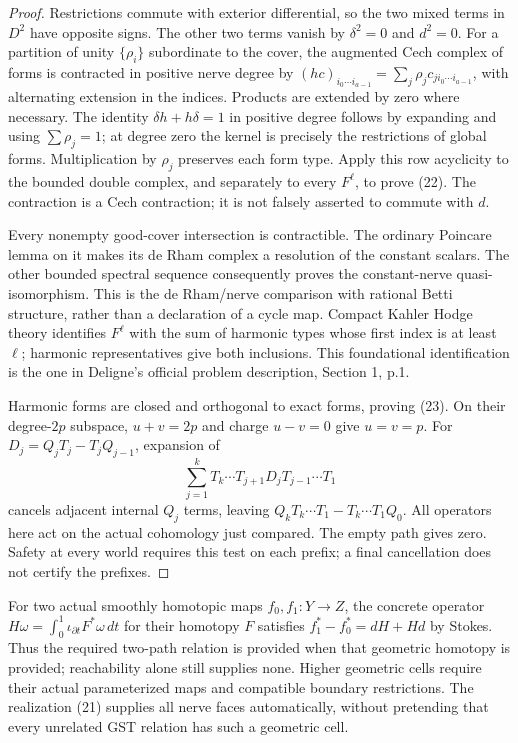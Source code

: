 \documentclass[11pt]{article}
\begin{document}
\begin{proof}
Restrictions commute with exterior differential, so the two mixed terms
in $D^2$ have opposite signs. The other two terms vanish by $\delta^2=0$
and $d^2=0$. For a partition of unity $\{\rho_i\}$ subordinate to the
cover, the augmented Cech complex of forms is contracted in positive
nerve degree by
$(hc)_{i_0\cdots i_{a-1}}=\sum_j\rho_j c_{j i_0\cdots i_{a-1}}$,
with alternating extension in the indices. Products are extended by zero
where necessary. The identity $\delta h+h\delta=1$ in positive degree
follows by expanding and using $\sum\rho_j=1$; at degree zero the kernel
is precisely the restrictions of global forms. Multiplication by $\rho_j$
preserves each form type. Apply this row acyclicity to the bounded
double complex, and separately to every $F^\ell$, to prove (22).
The contraction is a Cech contraction; it is not falsely asserted to
commute with $d$.

Every nonempty good-cover intersection is contractible. The ordinary
Poincare lemma on it makes its de Rham complex a resolution of the
constant scalars. The other bounded spectral sequence consequently proves
the constant-nerve quasi-isomorphism. This is the de Rham/nerve comparison
with rational Betti structure, rather than a declaration of a cycle map.
Compact Kahler Hodge theory identifies $F^\ell$ with the sum of harmonic
types whose first index is at least $\ell$; harmonic representatives give
both inclusions. This foundational identification is the one in Deligne's
official problem description, Section 1, p.1.

Harmonic forms are closed and orthogonal to exact forms, proving (23).
On their degree-$2p$ subspace, $u+v=2p$ and charge $u-v=0$ give $u=v=p$.
For $D_j=Q_jT_j-T_jQ_{j-1}$, expansion of
\[
 \sum_{j=1}^k T_k\cdots T_{j+1}D_jT_{j-1}\cdots T_1
\]
cancels adjacent internal $Q_j$ terms, leaving
$Q_kT_k\cdots T_1-T_k\cdots T_1Q_0$.
All operators here act on the actual cohomology just compared.
The empty path gives zero. Safety at every world requires this test on
each prefix; a final cancellation does not certify the prefixes.
\end{proof}

For two actual smoothly homotopic maps $f_0,f_1:Y\to Z$, the concrete
operator $H\omega=\int_0^1\iota_{\partial t}F^*\omega\,dt$ for their
homotopy $F$ satisfies $f_1^*-f_0^*=dH+Hd$ by Stokes. Thus the required
two-path relation is provided when that geometric homotopy is provided;
reachability alone still supplies none. Higher geometric cells require
their actual parameterized maps and compatible boundary restrictions.
The realization (21) supplies all nerve faces automatically, without
pretending that every unrelated GST relation has such a geometric cell.
\end{document}
